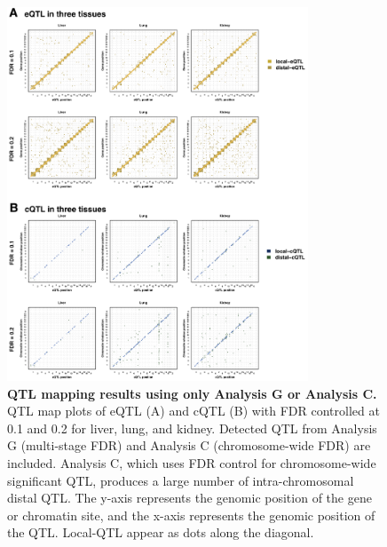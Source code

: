 \documentclass[10pt,letterpaper,twoside]{article}
\begin{document}
\clearpage

\begin{figure}[hp]
\renewcommand{\familydefault}{\sfdefault}\normalfont
\centering
\includegraphics[width=0.8\textwidth, trim={0in 0in 0in 0in}, clip]{figs/qtl_map_supplemental.png}
\caption{\textbf{QTL mapping results using only Analysis G or Analysis C.} 
QTL map plots of eQTL (A) and cQTL (B) with FDR controlled at 0.1 and 0.2 for liver, lung, and kidney. Detected QTL from Analysis G (multi-stage FDR) and Analysis C (chromosome-wide FDR) are included. Analysis C, which uses FDR control for chromosome-wide significant QTL, produces a large number of intra-chromosomal distal QTL. The y-axis represents the genomic position of the gene or chromatin site, and the x-axis represents the genomic position of the QTL. Local-QTL appear as dots along the diagonal.
\label{fig:grid_fdr_plot}}
\end{figure}

\clearpage
\end{document}
